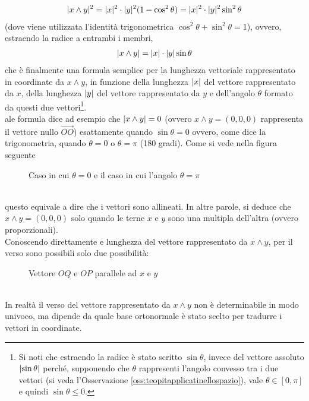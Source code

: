   \begin{eqnarray*}
    \lvert x\wedge y\rvert^2=\lvert x\rvert^2\cdot\lvert y\rvert^2(1-\cos^2\theta)=\lvert x\rvert^2\cdot\lvert y\rvert^2\sin^2\theta
  \end{eqnarray*}
  (dove viene utilizzata l'identità trigonometrica $\cos^2\theta+\sin^2\theta=1$), ovvero, estraendo la radice a entrambi i membri,
  \begin{eqnarray}
    \label{eq:teopitapplicatinellospazio15}
    \lvert x\wedge y\rvert=\lvert x\rvert\cdot\lvert y\rvert\sin\theta
  \end{eqnarray}
  che è finalmente una formula semplice per la lunghezza vettoriale rappresentato in coordinate da $x\wedge y$, in funzione della lunghezza $\lvert x\rvert$ del vettore rappresentato da $x$, della lunghezza $\lvert y\rvert$ del vettore rappresentato da $y$ e dell'angolo $\theta$ formato da questi due vettori\footnote{Si noti che estraendo la radice è stato scritto $\sin\theta$, invece del vettore assoluto $\lvert\sin\theta\rvert$ perché, supponendo che $\theta$ rappresenti l'angolo convesso tra i due vettori (si veda l'Osservazione \ref{oss:teopitapplicatinellospazio}), vale $\theta\in [0,\pi]$ e quindi $\sin \theta\leq 0$.}.\\ale formula dice ad esempio che $\lvert x\wedge y\rvert=0$ (ovvero $x\wedge y=(0,0,0)$ rappresenta il vettore nullo $\vec{OO}$) esattamente quando $\sin\theta=0$ ovvero, come dice la trigonometria, quando $\theta=0$ o $\theta=\pi$ (180 gradi). Come si vede nella figura seguente
  \begin{figure}[ht!]
    \centering
    \resizebox{5cm}{!}{
      
    }
    \caption{Caso in cui $\theta=0$ e il caso in cui l'angolo $\theta = \pi$}
    \label{fig:theta0thetapi}
  \end{figure}\\
  questo equivale a dire che i vettori sono allineati. In altre parole, si deduce che $x\wedge y= (0,0,0)$ solo quando le terne $x$ e $y$ sono una multipla dell'altra (ovvero proporzionali).\\
  Conoscendo direttamente e lunghezza del vettore rappresentato da $x\wedge y$, per il verso sono possibili solo due possibilità:
  \begin{figure}[ht!]
    \centering
    \resizebox{5cm}{!}{
      
    }
    \caption{Vettore $OQ$ e $OP$ parallele ad $x$ e $y$}
    \label{fig:oqopparassinellospazio}
  \end{figure}\\
  In realtà il verso del vettore rappresentato da $x\wedge y$ non è determinabile in modo univoco, ma dipende da quale base ortonormale è stato scelto per tradurre i vettori in coordinate.
  
